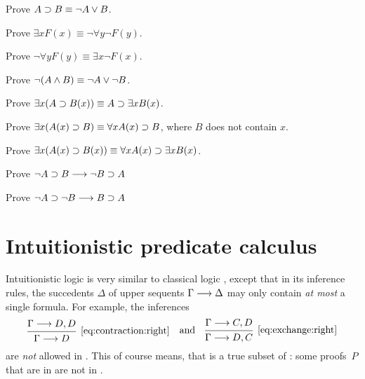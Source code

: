 \documentclass[11pt,a4paper]{article}
\begin{document}
\begin{exercise}[Exercise 2.5.2]\label{exe:2.5.2}
    Prove \(A\supset B \equiv \lnot A\lor B\).
\end{exercise}

\begin{exercise}[Exercise 2.5.3]\label{exe:2.5.3}
    Prove \(\exists x F(x) \equiv\lnot\forall y\lnot F(y)\).
\end{exercise}
\begin{exercise}[Exercise 2.5.4]\label{exe:2.5.4}
    Prove \(\lnot\forall yF(y) \equiv\exists x\lnot F(x)\).
\end{exercise}
\begin{exercise}[Exercise 2.5.5]\label{exe:2.5.5}
    Prove \(\lnot(A\land B) \equiv \lnot A\lor\lnot B\).
\end{exercise}
\begin{exercise}[Exercise 2.6.1]\label{exe:2.6.1}
    Prove \(\exists x(A\supset B(x))\equiv A\supset\exists xB(x)\).
\end{exercise}
\begin{exercise}[Exercise 2.6.2]\label{exe:2.6.2}
    Prove \(\exists x(A(x)\supset B)\equiv\forall xA(x)\supset B\),
    where \(B\) does not contain \(x\).
\end{exercise}
\begin{exercise}[Exercise 2.6.3]\label{exe:2.6.3}
    Prove \(\exists x(A(x)\supset B(x))\equiv\forall xA(x)\supset\exists xB(x)\).
\end{exercise}
\begin{exercise}[Exercise 2.6.4]\label{exe:2.6.4}
    Prove \(\lnot A\supset B\longrightarrow\lnot B\supset A\)
\end{exercise}
\begin{exercise}[Exercise 2.6.5]\label{exe:2.6.5}
    Prove \(\lnot A\supset\lnot B\longrightarrow B\supset A\)
\end{exercise}


\section{\texorpdfstring{Intuitionistic predicate calculus \LJ}{Intuitionistic predicate calculus LJ}}

Intuitionistic logic \LJ{} is very similar to classical logic \LK,
except that in its inference rules, the succedents \(\Delta\) of upper sequents \(\Gamma\longrightarrow\Delta\)
may only contain \emph{at most} a single formula. For example, the inferences
\begin{equation*}
    \begin{prooftree}
        \hypo{\Gamma\seq D, D}
        \infer1[\eqref{eq:contraction:right}]{\Gamma\seq D}
    \end{prooftree}
    \quad\text{and}\quad
    \begin{prooftree}
        \hypo{\Gamma\seq C, D}
        \infer1[\eqref{eq:exchange:right}]{\Gamma\seq D, C}
    \end{prooftree}
\end{equation*}
are \emph{not} allowed in \LJ{}. This of course means, that \LJ{} is a true subset of \LK:
some proofs~\(P\) that are in \LK{} are not in \LJ{}.
\end{document}
